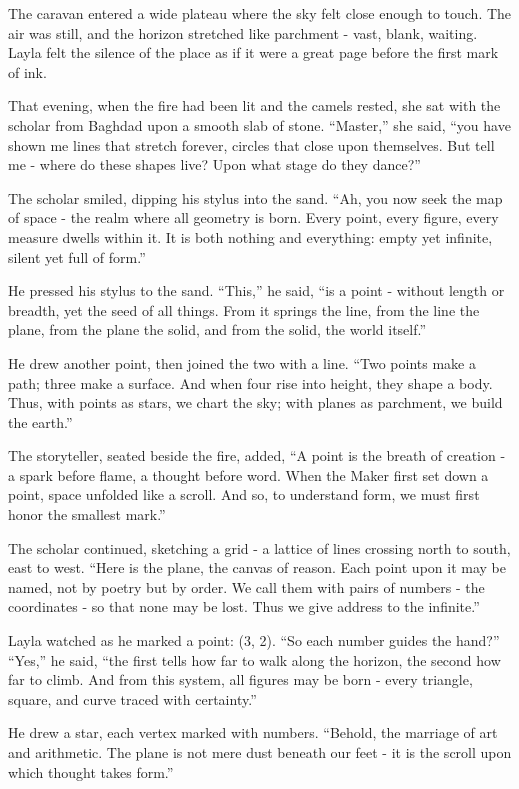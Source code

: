 \documentclass[
  letterpaper,
  DIV=11,
  numbers=noendperiod]{scrreprt}
\begin{document}
The caravan entered a wide plateau where the sky felt close enough to
touch. The air was still, and the horizon stretched like parchment -
vast, blank, waiting. Layla felt the silence of the place as if it were
a great page before the first mark of ink.

That evening, when the fire had been lit and the camels rested, she sat
with the scholar from Baghdad upon a smooth slab of stone. ``Master,''
she said, ``you have shown me lines that stretch forever, circles that
close upon themselves. But tell me - where do these shapes live? Upon
what stage do they dance?''

The scholar smiled, dipping his stylus into the sand. ``Ah, you now seek
the map of space - the realm where all geometry is born. Every point,
every figure, every measure dwells within it. It is both nothing and
everything: empty yet infinite, silent yet full of form.''

He pressed his stylus to the sand. ``This,'' he said, ``is a point -
without length or breadth, yet the seed of all things. From it springs
the line, from the line the plane, from the plane the solid, and from
the solid, the world itself.''

He drew another point, then joined the two with a line. ``Two points
make a path; three make a surface. And when four rise into height, they
shape a body. Thus, with points as stars, we chart the sky; with planes
as parchment, we build the earth.''

The storyteller, seated beside the fire, added, ``A point is the breath
of creation - a spark before flame, a thought before word. When the
Maker first set down a point, space unfolded like a scroll. And so, to
understand form, we must first honor the smallest mark.''

The scholar continued, sketching a grid - a lattice of lines crossing
north to south, east to west. ``Here is the plane, the canvas of reason.
Each point upon it may be named, not by poetry but by order. We call
them with pairs of numbers - the coordinates - so that none may be lost.
Thus we give address to the infinite.''

Layla watched as he marked a point: (3, 2). ``So each number guides the
hand?'' ``Yes,'' he said, ``the first tells how far to walk along the
horizon, the second how far to climb. And from this system, all figures
may be born - every triangle, square, and curve traced with certainty.''

He drew a star, each vertex marked with numbers. ``Behold, the marriage
of art and arithmetic. The plane is not mere dust beneath our feet - it
is the scroll upon which thought takes form.''
\end{document}
